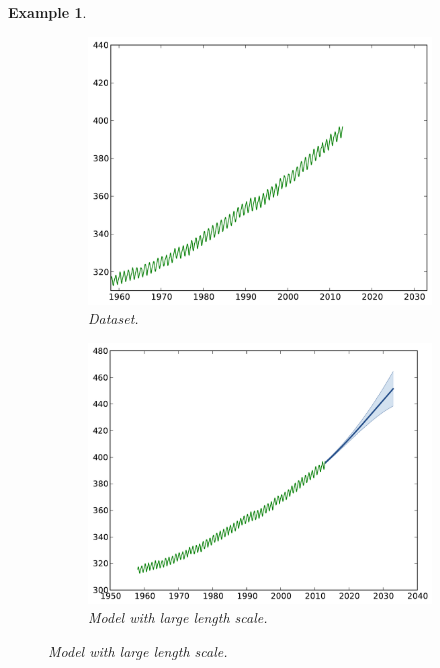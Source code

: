 \documentclass[twoside,openright]{report}
\newtheorem{example}{Example}
\begin{document}
\begin{example}
	\begin{figure}[ht!]
        \centering
        \begin{subfigure}[t]{0.30\textwidth}
                \includegraphics[width=\textwidth]{figures/python/CO2-data}
                \caption{Dataset.}
        \end{subfigure}%
        \hspace{0.2cm}       
        \begin{subfigure}[t]{0.30\textwidth}
                \includegraphics[width=\textwidth]{figures/python/CO2-rbfb}
                \caption{Model with large length scale.}
        \end{subfigure}
        \hspace{0.2cm}       

\end{figure}
\end{example}
\end{document}
